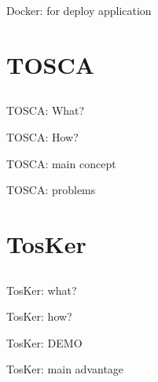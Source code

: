 \documentclass{beamer}
\begin{document}
  \begin{frame}{Docker: for deploy application}
    
  \end{frame}

\section{TOSCA}\subsection*{}

  \begin{frame}{TOSCA: What?}

  \end{frame}

  \begin{frame}{TOSCA: How?}

  \end{frame}

  \begin{frame}{TOSCA: main concept}

  \end{frame}

  \begin{frame}{TOSCA: problems}

  \end{frame}

\section{TosKer}\subsection*{}

  \begin{frame}{TosKer: what?}

  \end{frame}

  \begin{frame}{TosKer: how?}

  \end{frame}

  \begin{frame}{TosKer: DEMO}

  \end{frame}

  \begin{frame}{TosKer: main advantage}

  \end{frame}
\end{document}
